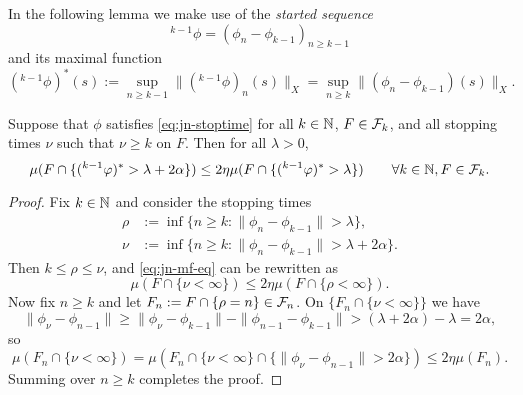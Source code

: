 In the following lemma we make use of the \emph{started sequence}
\begin{equation*}
  {}^{k-1}\phi = (\phi_n - \phi_{k-1})_{n \geq k-1}
\end{equation*}
and its maximal function
\begin{equation*}
  ({}^{k-1} \phi)^{*}(s) := \sup_{n \geq k-1} \|({}^{k-1}\phi)_n(s)\|_X = \sup_{n \geq k} \|(\phi_n - \phi_{k-1})(s)\|_X.
\end{equation*}

\begin{lem}\label{lem:jn-mf}
  Suppose that $\phi$ satisfies \eqref{eq:jn-stoptime} for all $k \in \mathbb{N}$, $F \in \mathcal{F}_k$, and all stopping times $\nu$ such that $\nu \geq k$ on $F$.
  Then for all $\lambda > 0$,
  \begin{equation}\label{eq:jn-mf-eq}
    \mu(F \cap \{ ({}^{k-1} \varphi)^{*} > \lambda + 2\alpha \}) \leq 2\eta \mu(F \cap \{  ({}^{k-1} \varphi)^{*} > \lambda \}) \qquad \forall k \in \mathbb{N}, F \in \mathcal{F}_{k}.
  \end{equation}
\end{lem}

\begin{proof}
  Fix $k \in \mathbb{N}$ and consider the stopping times
  \begin{equation*}
    \begin{aligned}
      \rho &:= \inf\{n \geq k : \|\phi_n - \phi_{k-1}\| > \lambda\}, \\
      \nu &:= \inf\{n \geq k : \|\phi_n - \phi_{k-1}\| > \lambda + 2\alpha\}.
    \end{aligned}
  \end{equation*}
  Then $k \leq \rho \leq \nu$, and \eqref{eq:jn-mf-eq} can be rewritten as
  \begin{equation*}
    \mu(F \cap \{\nu < \infty\}) \leq 2\eta \mu(F \cap \{\rho < \infty\}).
  \end{equation*}
  Now fix $n \geq k$ and let $F_n := F \cap \{\rho = n\} \in \mathcal{F}_n$.
  On $\{F_n \cap \{\nu < \infty\}\}$ we have
  \begin{equation*}
    \|\phi_{\nu} - \phi_{n-1}\| \geq \|\phi_{\nu} - \phi_{k-1}\| - \|\phi_{n-1} - \phi_{k-1}\| > (\lambda + 2\alpha) - \lambda = 2\alpha,
  \end{equation*}
  so
  \begin{equation*}
    \mu(F_n \cap \{\nu < \infty\}) = \mu(F_n \cap \{\nu < \infty\} \cap \{\|\phi_{\nu} - \phi_{n-1}\| > 2\alpha\} )
    \leq 2\eta \mu(F_n).
  \end{equation*}
  Summing over $n \geq k$ completes the proof.
\end{proof}

